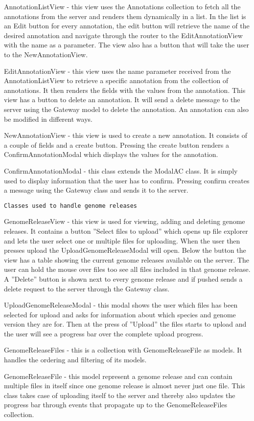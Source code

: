 AnnotationListView - this view uses the Annotations collection to fetch all the annotations from the server and renders them dynamically in a list.
In the list is an Edit button for every annotation, the edit button will retrieve the name of the desired annotation and navigate through the router to the EditAnnotationView with the name as a parameter.
The view also has a button that will take the user to the NewAnnotationView.

EditAnnotationView - this view uses the name parameter received from the AnnotationListView to retrieve a specific annotation from the collection of annotations. It then renders the fields with the values from the annotation. This view has a button to delete an annotation. It will send a delete message to the server using the Gateway model to delete the annotation. An annotation can also be modified in different ways.

NewAnnotationView - this view is used to create a new annotation. It consists of a couple of fields and a create button. Pressing the create button renders a ConfirmAnnotationModal which displays the values for the annotation.

ConfirmAnnotationModal - this class extends the ModalAC class. It is simply used to display information that the user has to confirm. Pressing confirm creates a message using the Gateway class and sends it to the server.

\texttt{Classes used to handle genome releases}

GenomeReleaseView - this view is used for viewing, adding and deleting genome releases. It contains a button ''Select files to upload'' which opens up file explorer and lets the user select one or multiple files for uploading. When the user then presses upload the UploadGenomeReleaseModal will open. Below the button the view has a table showing the current genome releases available on the server. The user can hold the mouse over files too see all files included in that genome release. A ''Delete'' button is shown next to every genome release and if pushed sends a delete request to the server through the Gateway class. 

UploadGenomeReleaseModal - this modal shows the user which files has been selected for upload and asks for information about which species and genome version they are for. Then at the press of ''Upload'' the files starts to upload and the user will see a progress bar over the complete upload progress. 

GenomeReleaseFiles - this is a collection with GenomeReleaseFile as models. It handles the ordering and filtering of its models. 

GenomeReleaseFile - this model represent a genome release and can contain multiple files in itself since one genome release is almost never just one file. This class takes case of uploading itself to the server and thereby also updates the progress bar through events that propagate up to the GenomeReleaseFiles collection. 
